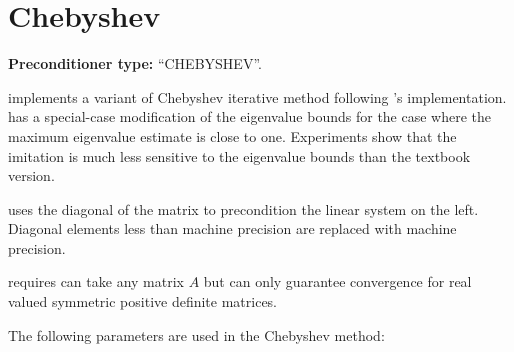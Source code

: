 \section{Chebyshev}\label{s:Chebyshev}

\textbf{Preconditioner type:} ``CHEBYSHEV''.


\ifpacktwo{} implements a variant of Chebyshev iterative method following
\ifpack{}'s implementation.  \ifpack{} has a special-case modification of the
eigenvalue bounds for the case where the maximum eigenvalue estimate is close to
one. Experiments show that the \ifpack{} imitation is much less sensitive to the
eigenvalue bounds than the textbook version.

\ifpacktwo{} uses the diagonal of the matrix to precondition the linear system on the
left. Diagonal elements less than machine precision are replaced with machine
precision.

\ifpacktwo{} requires can take any matrix $A$ but can only guarantee convergence
for real valued symmetric positive definite matrices.
\iffalse
If users could provide the ellipse parameters ($d$ and $c$ in the literature,
where $d$ is the real-valued center of the ellipse, and $d-c$ and $d+c$ the two
foci), the iteration itself would work fine with nonsymmetric real-valued $A$,
as long as the eigenvalues of $A$ can be bounded in an ellipse that is entirely
to the right of the origin.
\unsure[inline]{AP}{Really unsure about Chebyshev nonsymmetric matrices. There does not
seem anything in the code to work with ellipse. I need to ask Mark Hoemmen
about this.}
\fi

The following parameters are used in the Chebyshev method:

